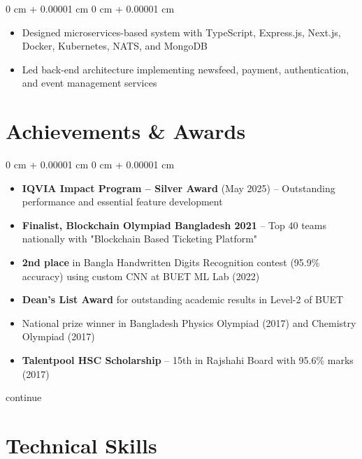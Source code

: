 \documentclass[10pt, letterpaper]{article}
\newenvironment{highlights}{
    \begin{itemize}[
        topsep=0.10 cm,
        parsep=0.10 cm,
        partopsep=0pt,
        itemsep=0pt,
        leftmargin=0 cm + 10pt
    ]
}{
    \end{itemize}
} %
\newenvironment{onecolentry}{
    \begin{adjustwidth}{
        0 cm + 0.00001 cm
    }{
        0 cm + 0.00001 cm
    }
}{
    \end{adjustwidth}
} %
\begin{document}
        
        \begin{onecolentry}
            \begin{highlights}
    \item Designed microservices-based system with TypeScript, Express.js, Next.js, Docker, Kubernetes, NATS, and MongoDB
    \item Led back-end architecture implementing newsfeed, payment, authentication, and event management services
\end{highlights}
        \end{onecolentry}

    \section{Achievements \& Awards}

        \begin{onecolentry}
            \begin{highlights}
                \item \textbf{IQVIA Impact Program – Silver Award} (May 2025) -- Outstanding performance and essential feature development
                \item \textbf{Finalist, Blockchain Olympiad Bangladesh 2021} -- Top 40 teams nationally with "Blockchain Based Ticketing Platform"
                \item \textbf{2nd place} in Bangla Handwritten Digits Recognition contest (95.9\% accuracy) using custom CNN at BUET ML Lab (2022)
                \item \textbf{Dean's List Award} for outstanding academic results in Level-2 of BUET
                \item National prize winner in Bangladesh Physics Olympiad (2017) and Chemistry Olympiad (2017)
                \item \textbf{Talentpool HSC Scholarship} -- 15th in Rajshahi Board with 95.6\% marks (2017)
            \end{highlights}continue
            
        \end{onecolentry}

         \section{Technical Skills}
\end{document}
